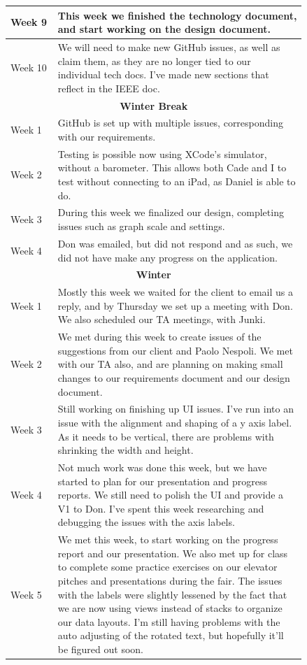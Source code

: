 \documentclass[onecolumn, draftclsnofoot,10pt, compsoc]{IEEEtran}
\begin{document}
\begin{center}
\begin{longtable}{| l | p{0.84\linewidth}|}
	Week 9 & This week we finished the technology document, and start working on the design document. \\ \hline
  Week 10 & We will need to make new GitHub issues, as well as claim them, as they are no longer tied to our individual tech docs.  I've made new sections that reflect in the IEEE doc. \\ \hline
  \multicolumn{2}{c}{\textbf{Winter Break}} \\ \hline
  Week 1 & GitHub is set up with multiple issues, corresponding with our requirements.  \\ \hline
  Week 2 & Testing is possible now using XCode's simulator, without a barometer.  This allows both Cade and I to test without connecting to an iPad, as Daniel is able to do.  \\ \hline
  Week 3 & During this week we finalized our design, completing issues such as graph scale and settings. \\ \hline
  Week 4 & Don was emailed, but did not respond and as such, we did not have make any progress on the application. \\ \hline
  \multicolumn{2}{c}{\textbf{Winter}} \\ \hline
  Week 1 & Mostly this week we waited for the client to email us a reply, and by Thursday we set up a meeting with Don.  We also scheduled our TA meetings, with Junki. \\ \hline
	Week 2 & We met during this week to create issues of the suggestions from our client and Paolo Nespoli.  We met with our TA also, and are planning on making small changes to our requirements document and our design document. \\ \hline
	Week 3 & Still working on finishing up UI issues.  I've run into an issue with the alignment and shaping of a y axis label. As it needs to be vertical, there are problems with shrinking the width and height.  \\ \hline
	Week 4 & Not much work was done this week, but we have started to plan for our presentation and progress reports.  We still need to polish the UI and provide a V1 to Don.  I've spent this week researching and debugging the issues with the axis labels. \\ \hline
  Week 5 & We met this week, to start working on the progress report and our presentation.  We also met up for class to complete some practice exercises on our elevator pitches and presentations during the fair.  The issues with the labels were slightly lessened by the fact that we are now using views instead of stacks to organize our data layouts.  I'm still having problems with the auto adjusting of the rotated text, but hopefully it'll be figured out soon. \\ \hline

\end{longtable}
\end{center}
\end{document}
